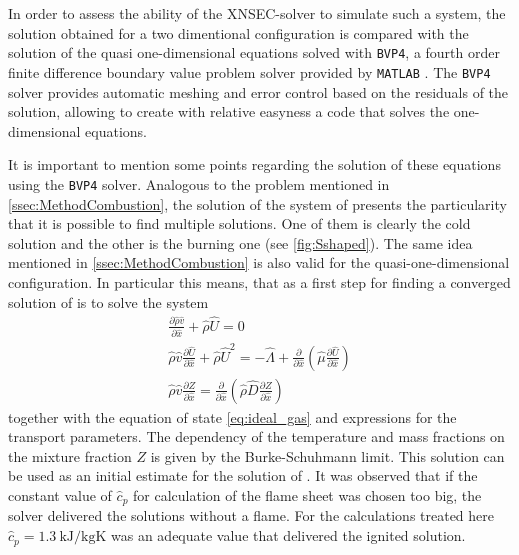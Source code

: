 In order to assess the ability of the XNSEC-solver to simulate such a system, the solution obtained for a two dimentional configuration is compared with the solution of the quasi one-dimensional equations solved with \lstinline|BVP4|, a fourth order finite difference boundary value problem solver provided by \lstinline|MATLAB| \parencite{kierzenkaBVPSolverBased2001}. The \lstinline|BVP4| solver provides automatic meshing and error control based on the residuals of the solution, allowing to create with relative easyness a code that solves the one-dimensional equations.

It is important to mention some points regarding the solution of these equations using the \lstinline|BVP4| solver. Analogous to the problem mentioned in \cref{ssec:MethodCombustion}, the solution of the system of   presents the particularity that it is possible to find multiple solutions. One of them is clearly the cold solution and the other is the burning one (see \cref{fig:Sshaped}). The same idea mentioned in \cref{ssec:MethodCombustion} is also valid for the quasi-one-dimensional configuration. In particular this means, that as a first step for finding a converged solution of  is to solve the system
\begin{subequations}
\begin{gather}
\frac{\partial \hat \rho \hat v}{\partial \hat x} +  \hat \rho \hat U = 0\\ \label{eq:OneDimCont2}%
\hat \rho \hat v \frac{\partial \hat U}{\partial \hat x} + \hat \rho \hat U^2 =
- \hat \Lambda
+ \frac{\partial}{\partial \hat x}\left(\hat \mu \frac{\partial \hat U}{\partial \hat x}\right)\\ \label{eq:OneDimMom2}%
\hat \rho \hat v \frac{\partial Z}{\partial \hat x} = 
\frac{\partial}{\partial \hat x}\left(\hat \rho \hat D \frac{\partial Z}{\partial \hat x}\right)
\end{gather}\label{eqs:OneDimEquationsMixtureFraction}
\end{subequations}
together with the equation of state \cref{eq:ideal_gas} and expressions for the transport parameters. The dependency of the temperature and mass fractions on the mixture fraction $Z$ is given by the Burke-Schuhmann limit. This solution can be used as an initial estimate for the solution of . It was observed that if the constant value of $\hat c_p$ for calculation of the flame sheet was chosen too big, the solver delivered the solutions without a flame. For the calculations treated here $\hat c_p =\SI{1.3}{\kilo \joule\per\kilogram \kelvin}$ was an adequate value that delivered the ignited solution. 

